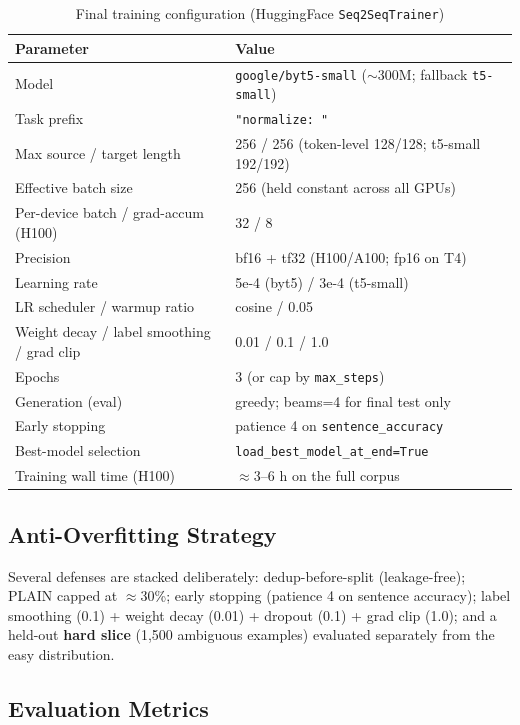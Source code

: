 \documentclass[12pt,a4paper]{article}
\begin{document}
\begin{table}[H]
\centering
\caption{Final training configuration (HuggingFace \texttt{Seq2SeqTrainer})}
\begin{tabular}{ll}
\toprule
\textbf{Parameter} & \textbf{Value} \\
\midrule
Model & \texttt{google/byt5-small} ($\sim$300M; fallback \texttt{t5-small}) \\
Task prefix & \texttt{"normalize: "} \\
Max source / target length & 256 / 256 (token-level 128/128; t5-small 192/192) \\
Effective batch size & 256 (held constant across all GPUs) \\
Per-device batch / grad-accum (H100) & 32 / 8 \\
Precision & bf16 + tf32 (H100/A100; fp16 on T4) \\
Learning rate & 5e-4 (byt5) / 3e-4 (t5-small) \\
LR scheduler / warmup ratio & cosine / 0.05 \\
Weight decay / label smoothing / grad clip & 0.01 / 0.1 / 1.0 \\
Epochs & 3 (or cap by \texttt{max\_steps}) \\
Generation (eval) & greedy; beams=4 for final test only \\
Early stopping & patience 4 on \texttt{sentence\_accuracy} \\
Best-model selection & \texttt{load\_best\_model\_at\_end=True} \\
Training wall time (H100) & $\approx$3--6 h on the full corpus \\
\bottomrule
\end{tabular}
\end{table}

\subsection{Anti-Overfitting Strategy}

Several defenses are stacked deliberately: dedup-before-split (leakage-free); PLAIN capped at $\approx$30\%; early stopping (patience 4 on sentence accuracy); label smoothing (0.1) + weight decay (0.01) + dropout (0.1) + grad clip (1.0); and a held-out \textbf{hard slice} (1,500 ambiguous examples) evaluated separately from the easy distribution.

\subsection{Evaluation Metrics}
\end{document}
